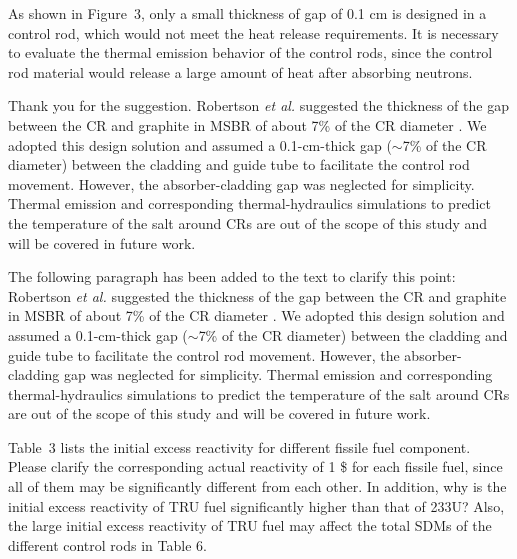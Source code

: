 \documentclass[answers,11pt]{exam}
\begin{document}
\begin{questions}
\begin{solution}
     
\end{solution}

\question As shown in Figure~3, only a small thickness of gap of 0.1 cm is designed in a control rod, which would not meet the heat release requirements. It is necessary to evaluate the thermal emission behavior of the control rods, since the control rod material would release a large amount of heat after absorbing neutrons.
\begin{solution}
	
    Thank you for the suggestion. Robertson \emph{et al.} suggested the thickness of the gap between the CR and graphite in MSBR of about 7\% of the CR diameter \cite{robertson_conceptual_1971}. We adopted this design solution and assumed a 0.1-cm-thick gap ($\sim$7\% of the CR diameter) between the cladding and guide tube to facilitate the control rod movement. However, the absorber-cladding gap was neglected for simplicity. Thermal emission and corresponding thermal-hydraulics simulations to predict the temperature of the salt around CRs are out of the scope of this study and will be covered in future work.
	
	The following paragraph has been added to the text to clarify this point:\\
	
	Robertson \emph{et al.} suggested the thickness of the gap between the CR and graphite in MSBR of about 7\% of the CR diameter \cite{robertson_conceptual_1971}. We adopted this design solution and assumed a 0.1-cm-thick gap ($\sim$7\% of the CR diameter) between the cladding and guide tube to facilitate the control rod movement. However, the absorber-cladding gap was neglected for simplicity. Thermal emission and corresponding thermal-hydraulics simulations to predict the temperature of the salt around CRs are out of the scope of this study and will be covered in future work.
	
	
\end{solution}

\question Table~3 lists the initial excess reactivity for different fissile fuel component. Please clarify the corresponding actual reactivity of 1 \$ for each fissile fuel, since all of them may be significantly different from each other. In addition, why is the initial excess reactivity of TRU fuel significantly higher than that of 233U? Also, the large initial excess reactivity of TRU fuel may affect the total SDMs of the different control rods in Table 6.
\begin{solution}
	

\end{solution}
\end{questions}
\end{document}
